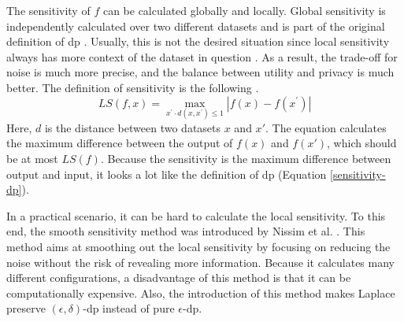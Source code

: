 The sensitivity of $f$ can be calculated globally and locally.
Global sensitivity is independently calculated over two different datasets and is part of the original definition of \gls{dp} \citep{dwork_differential_2006}.
Usually, this is not the desired situation since local sensitivity always has more context of the dataset in question \citep{nissim_smooth_2007}.
As a result, the trade-off for noise is much more precise, and the balance between utility and privacy is much better.
The definition of sensitivity is the following \citep{nissim_smooth_2007}.
\begin{equation}
  LS(f,x)=\operatorname*{max}_{x^{\prime}\cdot d(x,x^{\prime})\leq1}|f(x)-f(x^{\prime})|
  \label{local-sensitivity}
\end{equation}
Here, $d$ is the distance between two datasets $x$ and $x'$.
The equation calculates the maximum difference between the output of $f(x)$ and $f(x')$, which should be at most $LS(f)$.
Because the sensitivity is the maximum difference between output and input, it looks a lot like the definition of \gls{dp} (Equation \ref{sensitivity-dp}).

In a practical scenario, it can be hard to calculate the local sensitivity.
To this end, the smooth sensitivity method was introduced by Nissim et al.  \citep{nissim_smooth_2007}.
This method aims at smoothing out the local sensitivity by focusing on reducing the noise without the risk of revealing more information.
Because it calculates many different configurations, a disadvantage of this method is that it can be computationally expensive.
Also, the introduction of this method makes Laplace preserve $(\epsilon, \delta)$-\gls{dp} instead of pure $\epsilon$-\gls{dp}.



\newpage
